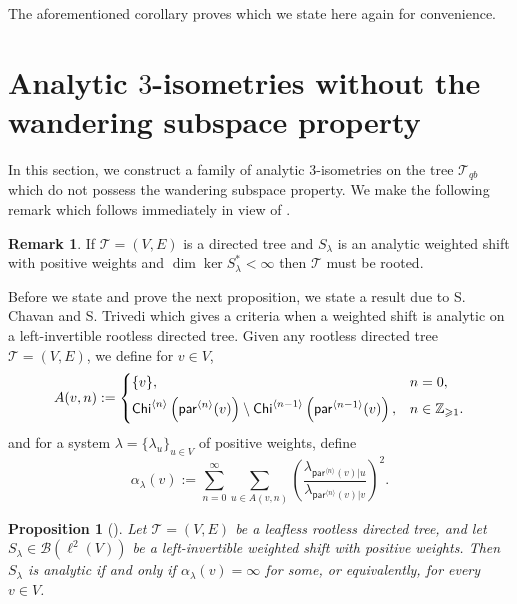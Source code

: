 \documentclass[11pt, reqno, a4paper]{amsart}
\newtheorem{proposition}[theorem]{Proposition}
\theoremstyle{definition}
\newtheorem{remark}[theorem]{Remark}
\newcommand{\calB}{{\mathcal{B}}}
\newcommand{\scrT}{{\mathscr T}}
\renewcommand{\geq}{\geqslant}
\newcommand{\Chi}{\mathsf{Chi}}
\newcommand{\pr}{\mathsf{par}}
\numberwithin{equation}{section}
\begin{document}
    The aforementioned corollary proves  which we state here again for convenience.
    
    \mConcaveCounterexample*

    
\section{Analytic \texorpdfstring{$3$}{3}-isometries without the wandering subspace property}\label{sec:3-isometry}

    In this section, we construct a family of analytic $3$-isometries on the tree $\scrT_{qb}$ which do not possess the wandering subspace property.  We make the following remark which follows immediately in view of .
    
    \begin{remark}
        If $\scrT = (V,E)$ is a directed tree and $S_{\lambda}$ is an analytic weighted shift with positive weights and $\dim \ker S_{\lambda} ^{*} < \infty$ then $\scrT$ must be rooted.
        \label{remark:analytic-finite-codimension-rooted}
    \end{remark}
    
    Before we state and prove the next proposition, we state a result due to S. Chavan and S. Trivedi which gives a criteria when a weighted shift is analytic on a left-invertible rootless directed tree.  Given any rootless directed tree $\scrT = (V, E)$, we define for $v \in V$,
    \begin{equation*}
        A(v,n) := \begin{dcases}
            \{v\}, & n=0, \\
            \Chi^{\langle n\rangle} \left(\pr^{\langle n\rangle}(v)\right) \setminus \Chi^{\langle n-1\rangle} \left(\pr^{\langle n-1\rangle}(v)\right), & n\in\mathbb Z_{\geq 1}.
        \end{dcases}
    \end{equation*}
    and for a system $\lambda=\{\lambda_u\}_{u\in V}$ of positive weights, define
    \begin{equation*}
        \alpha_\lambda(v) := \sum_{n=0}^{\infty}\sum_{u\in A(v,n)} \left( \frac{\lambda_{\pr^{\langle n\rangle}(v)|u}} {\lambda_{\pr^{\langle n\rangle}(v)|v}} \right)^2.
    \end{equation*}

    \begin{proposition}[{\cite[Corollary 3.4]{MR5052237}}] \label{prop:3-isometry-characterisation}
        Let $\scrT = (V, E)$ be a leafless rootless directed tree, and let $S_{\lambda} \in \calB (\ell ^2 (V))$ be a left-invertible weighted shift with positive weights. Then $S_{\lambda}$ is analytic if and only if $\alpha_{\lambda} (v) = \infty$ for some, or equivalently, for every $v \in V$.
        \label{prop:analytic-criterion}
    \end{proposition}
\end{document}
